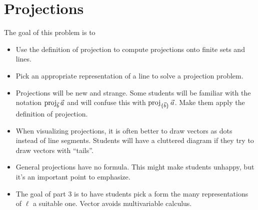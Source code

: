 \documentclass{workbook}
\newcommand{\displayonlynewpage}{\begin{displayonly}\newpage\end{displayonly}}
\newcommand{\bookonlynewpage}{\begin{bookonly}\newpage\end{bookonly}}
\begin{document}
\begin{slide}
	\bookonlynewpage
	\displayonlynewpage
\section*{Projections}


	\question
	\begin{annotation}
		\begin{goals}

			The goal of this problem is to
			\begin{itemize}
				\item Use the definition of projection to compute projections onto finite sets and lines.
				\item Pick an appropriate representation of a line to solve a projection problem.
			\end{itemize}
		\end{goals}
		\begin{notes}
			\begin{itemize}
				\item Projections will be new and strange. Some students will be familiar with
					the notation $\operatorname{proj}_{\vec b}\vec a$ and will confuse this
					with $\operatorname{proj}_{\{\vec b\}}\vec a$. Make them apply the definition of projection.
				\item When visualizing projections, it is often better to draw vectors as dots instead
					of line segments. Students will have a cluttered diagram if they try to
					draw vectors with ``tails''.
				\item General projections have no formula. This might make students unhappy, but it's an
					important point to emphasize.
				\item The goal of part 3 is to have students pick a form the many representations of $\ell$
					a suitable one. Vector avoids multivariable calculus.


\end{itemize}
\end{notes}
\end{annotation}
\end{slide}
\end{document}
